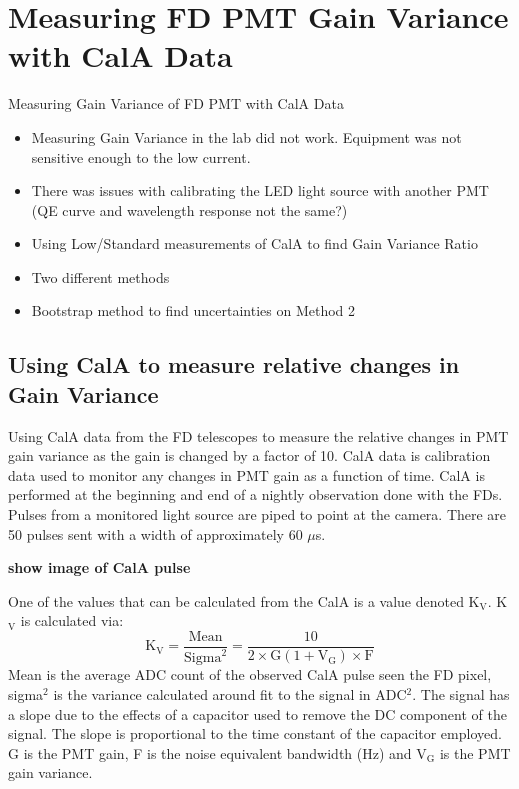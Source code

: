 \chapter[Measuring FD PMT Gain Variance with CalA Data]{\centering Measuring FD PMT Gain Variance with CalA Data \\}\label{Ch:GainVariance}

Measuring Gain Variance of FD PMT with CalA Data
\begin{itemize}
\item Measuring Gain Variance in the lab did not work. Equipment was not sensitive enough to the low current.
\item There was issues with calibrating the LED light source with another PMT (QE curve and wavelength response not the same?)
\item Using Low/Standard measurements of CalA to find Gain Variance Ratio
\item Two different methods
\item Bootstrap method to find uncertainties on Method 2
\end{itemize}

\section{Using CalA to measure relative changes in Gain Variance}

Using CalA data from the FD telescopes to measure the relative changes in PMT  gain variance as the gain is changed by a factor of 10. CalA data is calibration data used to monitor any changes in PMT gain as a function of time. CalA is performed at the beginning and end of a nightly observation done with the FDs. Pulses from a monitored light source are piped to point at the camera. There are 50 pulses sent with a width of approximately 60 $\mu$s.

\textbf{show image of CalA pulse}

One of the values that can be calculated from the CalA is a value denoted K$_{\mathrm{V}}$. K$_{\mathrm{V}}$ is calculated via:
\begin{equation}
\mathrm{K}_{\mathrm{V}} = \frac{\mathrm{Mean}}{\mathrm{Sigma}^2} = \frac{10}{2 \times \mathrm{G} (1 + \mathrm{V}_{\mathrm{G}}) \times \mathrm{F}}
\end{equation}
Mean is the average ADC count of the observed CalA pulse seen the FD pixel, sigma$^2$ is the variance calculated around fit to the signal in ADC$^2$. The signal has a slope due to the effects of a capacitor used to remove the DC component of the signal. The slope is proportional to the time constant of the capacitor employed. G is the PMT gain, F is the noise equivalent bandwidth (Hz) and V$_{\mathrm{G}}$ is the PMT gain variance.

